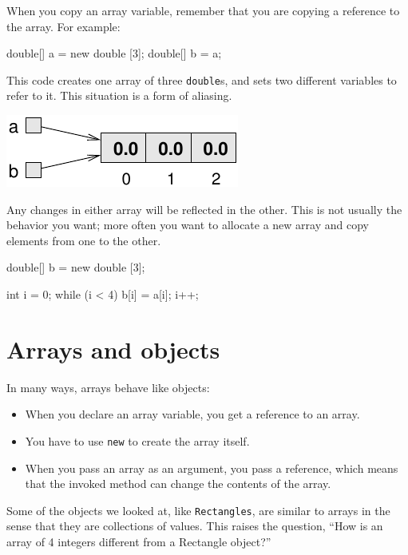 When you copy an array variable, remember that you are
copying a reference to the array.  For example:

\begin{code}
    double[] a = new double [3];
    double[] b = a;
\end{code}

This code creates one array of three {\tt double}s, and
sets two different variables to refer to it.
This situation is a form of aliasing.


\includegraphics{figs/array3.pdf}


Any changes in either array
will be reflected in the other.  This is not usually the
behavior you want; more often you want to
allocate a new array and copy elements from
one to the other.

\begin{code}
    double[] b = new double [3];

    int i = 0;
    while (i < 4) {
      b[i] = a[i];
      i++;
    }
\end{code}


\section{Arrays and objects}

In many ways, arrays behave like objects:

\begin{itemize}

\item When you declare an array variable, you get a reference
to an array.

\item You have to use {\tt new} to create the array itself.

\item When you pass an array as an argument, you pass a reference,
which means that the invoked method can change the contents
of the array.

\end{itemize}

Some of the objects we looked at, like {\tt Rectangles}, are
similar to arrays in the sense that they are collections of
values.  This raises the question, ``How is an array of 4 integers
different from a Rectangle object?''


